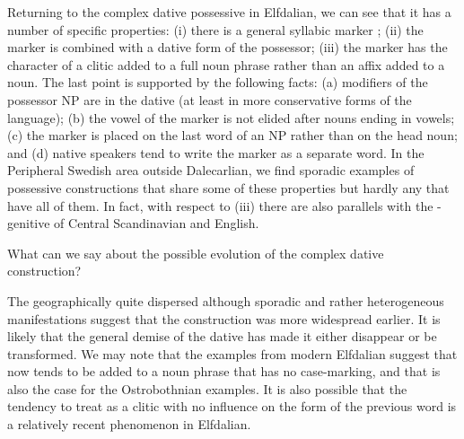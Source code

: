 
Returning to the complex dative possessive in Elfdalian, we can see that it has a number of specific properties: (i) there is a general syllabic marker ; (ii) the marker is combined with a dative form of the possessor; (iii) the marker has the character of a clitic added to a full noun phrase rather than an affix added to a noun. The last point is supported by  the following facts: (a) modifiers of the possessor NP are in the dative (at least in more conservative forms of the language); (b) the vowel of the marker is not elided after nouns ending in vowels; (c) the marker is placed on the last word of an NP rather than on the head noun; and (d) native speakers tend to write the marker as a separate word. In the Peripheral Swedish area outside Dalecarlian, we find sporadic examples of possessive constructions that share some of these properties but hardly any that have all of them. In fact, with respect to (iii) there are also parallels with the -genitive of Central Scandinavian and English. 


What can we say about the possible evolution of the complex dative construction? 


The geographically quite dispersed although sporadic and rather heterogeneous manifestations suggest that the construction was more widespread earlier. It is likely that the general demise of the dative has made it either disappear or be transformed. We may note that the examples from modern Elfdalian suggest that now tends to be added to a noun phrase that has no case-marking, and that is also the case for the Ostrobothnian examples. It is also possible that the tendency to treat  as a clitic with no influence on the form of the previous word is a relatively recent phenomenon in Elfdalian.  


